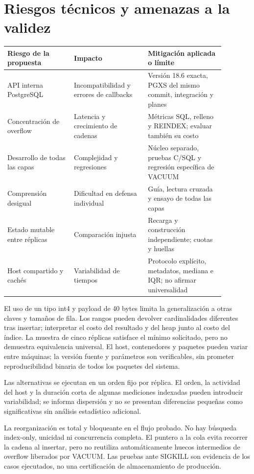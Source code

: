 \documentclass[11pt,a4paper]{article}
\begin{document}
\section{Riesgos técnicos y amenazas a la validez}

\begin{longtable}{P{0.27\linewidth}P{0.3\linewidth}P{0.31\linewidth}}
\toprule
Riesgo de la propuesta & Impacto & Mitigación aplicada o límite\\
\midrule
API interna PostgreSQL
  & Incompatibilidad y errores de callbacks
  & Versión 18.6 exacta, PGXS del mismo commit, integración y planes\\
Concentración de overflow
  & Latencia y crecimiento de cadenas
  & Métricas SQL, relleno y REINDEX; evaluar también su costo\\
Desarrollo de todas las capas
  & Complejidad y regresiones
  & Núcleo separado, pruebas C/SQL y regresión específica de VACUUM\\
Comprensión desigual
  & Dificultad en defensa individual
  & Guía, lectura cruzada y ensayo de todas las capas\\
Estado mutable entre réplicas
  & Comparación injusta
  & Recarga y construcción independiente; cuotas y huellas\\
Host compartido y cachés
  & Variabilidad de tiempos
  & Protocolo explícito, metadatos, mediana e IQR; no afirmar universalidad\\
\bottomrule
\end{longtable}

El uso de un tipo int4 y payload de 40 bytes limita la generalización a otras
claves y tamaños de fila. Los rangos pueden devolver cardinalidades diferentes
tras insertar; interpretar el costo del resultado y del heap junto al costo del
índice. La muestra de cinco réplicas satisface el mínimo solicitado, pero no
demuestra equivalencia universal. El host, contenedores y paquetes pueden variar
entre máquinas; la versión fuente y parámetros son verificables, sin prometer
reproducibilidad binaria de todos los paquetes del sistema.

Las alternativas se ejecutan en un orden fijo por réplica. El orden, la actividad
del host y la duración corta de algunas mediciones indexadas pueden introducir
variabilidad; se informa dispersión y no se presentan diferencias pequeñas como
significativas sin análisis estadístico adicional.

La reorganización es total y bloqueante en el flujo probado. No hay búsqueda
index-only, unicidad ni concurrencia completa. El puntero a la cola evita recorrer
la cadena al insertar, pero no reutiliza automáticamente huecos intermedios de
overflow liberados por VACUUM. Las pruebas ante SIGKILL son evidencia de los
casos ejecutados, no una certificación de almacenamiento de producción.
\end{document}
